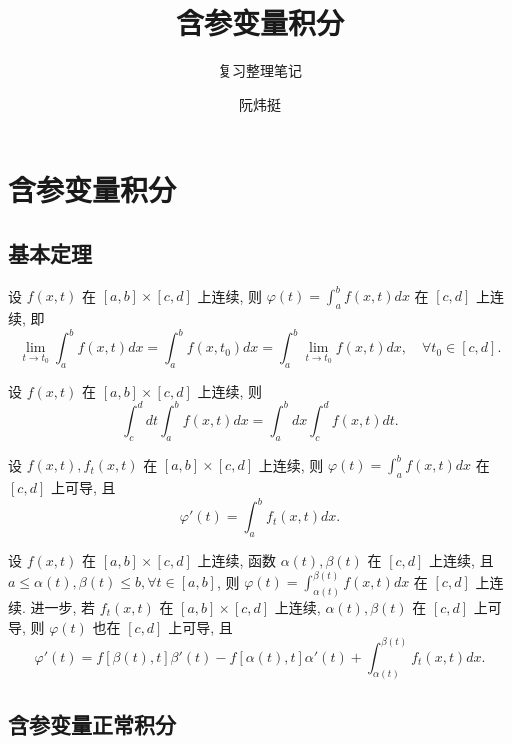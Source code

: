 \documentclass[lang=cn,newtx,10pt,scheme=chinese]{elegantbook}
\title{含参变量积分}
\subtitle{复习整理笔记}
\author{阮炜挺}
\institute{宁波大学数学与统计学院}
\date{}
\begin{document}
\maketitle
\frontmatter

\tableofcontents

\mainmatter

\chapter{含参变量积分}

\section{基本定理}

\begin{theorem}[连续性]
设 $f(x,t)$ 在 $[a,b] \times [c,d]$ 上连续, 则 $\varphi(t) = \int_{a}^{b} f(x,t) dx$ 在 $[c,d]$ 上连续, 即
$$ \lim\limits_{t \to t_0} \int_{a}^{b} f(x,t) dx = \int_{a}^{b} f(x, t_0) dx = \int_{a}^{b} \lim\limits_{t \to t_0} f(x,t) dx, \quad \forall t_0 \in [c,d]. $$
\end{theorem}

\begin{theorem}[交换积分次序]
设 $f(x,t)$ 在 $[a,b] \times [c,d]$ 上连续, 则
$$ \int_{c}^{d} dt \int_{a}^{b} f(x,t) dx = \int_{a}^{b} dx \int_{c}^{d} f(x,t) dt. $$
\end{theorem}

\begin{theorem}[可微性]
设 $f(x,t), f_t(x,t)$ 在 $[a,b] \times [c,d]$ 上连续, 则 $\varphi(t) = \int_{a}^{b} f(x,t) dx$ 在 $[c,d]$ 上可导, 且
$$ \varphi'(t) = \int_{a}^{b} f_t(x,t) dx. $$
\end{theorem}

\begin{theorem}[一般情形的连续性与可微性]
设 $f(x,t)$ 在 $[a,b] \times [c,d]$ 上连续, 函数 $\alpha(t), \beta(t)$ 在 $[c,d]$ 上连续, 且 $a \le \alpha(t), \beta(t) \le b, \forall t \in [a,b]$, 则 $\varphi(t) = \int_{\alpha(t)}^{\beta(t)} f(x,t) dx$ 在 $[c,d]$ 上连续. 进一步, 若 $f_t(x,t)$ 在 $[a,b] \times [c,d]$ 上连续, $\alpha(t), \beta(t)$ 在 $[c,d]$ 上可导, 则 $\varphi(t)$ 也在 $[c,d]$ 上可导, 且
$$ \varphi'(t) = f[\beta(t),t]\beta'(t) - f[\alpha(t),t]\alpha'(t) + \int_{\alpha(t)}^{\beta(t)} f_t(x,t) dx. $$
\end{theorem}

\section{含参变量正常积分}
\end{document}
